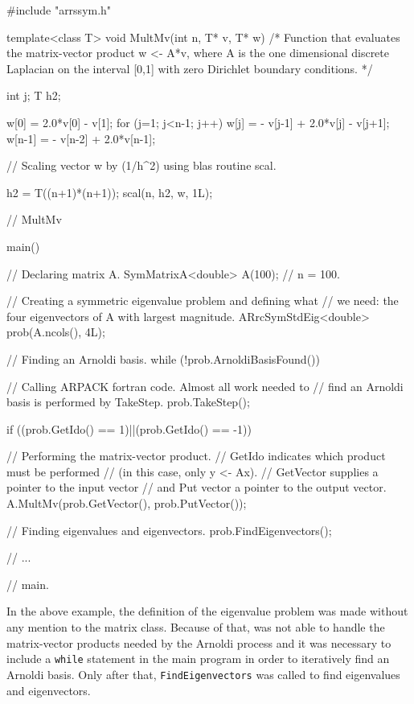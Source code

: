\begin{cppcode}
#include "arrssym.h"

template<class T> 
void MultMv(int n, T* v, T* w)
/*
Function that evaluates the matrix-vector product w <- A*v,
where A is the one dimensional discrete Laplacian on
the interval [0,1] with zero Dirichlet boundary conditions. 
*/
{
	
	int  j;
	T    h2;
	
	w[0] =  2.0*v[0] - v[1];
	for (j=1; j<n-1; j++) {
		w[j] = - v[j-1] + 2.0*v[j] - v[j+1];
	}
	w[n-1] = - v[n-2] + 2.0*v[n-1];
	
	// Scaling vector w by (1/h^2) using blas routine scal.
	
	h2 = T((n+1)*(n+1));
	scal(n, h2, w, 1L);
	
} // MultMv

main()
{
	// Declaring matrix A.
	SymMatrixA<double> A(100); // n = 100.
	
	// Creating a symmetric eigenvalue problem and defining what
	// we need: the four eigenvectors of A with largest magnitude.
	ARrcSymStdEig<double> prob(A.ncols(), 4L);
	
	// Finding an Arnoldi basis. 
	while (!prob.ArnoldiBasisFound()) {
		
		// Calling ARPACK fortran code. Almost all work needed to
		// find an Arnoldi basis is performed by TakeStep.
		prob.TakeStep();
		
		if ((prob.GetIdo() == 1)||(prob.GetIdo() == -1)) {
			
			// Performing the matrix-vector product.
			// GetIdo indicates which product must be performed
			// (in this case, only y <- Ax).
			// GetVector supplies a pointer to the input vector
			// and Put vector a pointer to the output vector.
			A.MultMv(prob.GetVector(), prob.PutVector());
		}
	}
	
	// Finding eigenvalues and eigenvectors. 
	prob.FindEigenvectors();
	
	// ...
	
} // main.
\end{cppcode}

In the above example, the definition of the eigenvalue problem was made without any mention to the matrix class. Because of that, \ARPP{} was not able to handle the matrix-vector products needed by the Arnoldi process and it was necessary to include a \texttt{while} statement in the main program in order to iteratively find an Arnoldi basis. Only after that, \texttt{FindEigenvectors} was called to find eigenvalues and eigenvectors.

